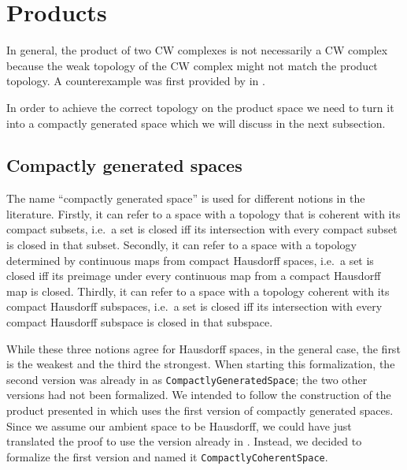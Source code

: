 \section{Products}\label{sec:products}

In general, the product of two CW complexes is not necessarily a CW complex because the weak topology of the CW complex might not match the product topology. 
A counterexample was first provided by \citeauthor{Dowker1952} in \cite{Dowker1952}.

In order to achieve the correct topology on the product space we need to turn it into a compactly generated space which we will discuss in the next subsection.

\subsection{Compactly generated spaces}

The name ``compactly generated space'' is used for different notions in the literature.
Firstly, it can refer to a space with a topology that is coherent with its compact subsets, i.e.\ a set is closed iff its intersection with every compact subset is closed in that subset. 
Secondly, it can refer to a space with a topology determined by continuous maps from compact Hausdorff spaces, i.e.\ a set is closed iff its preimage under every continuous map from a compact Hausdorff map is closed. 
Thirdly, it can refer to a space with a topology coherent with its compact Hausdorff subspaces, i.e.\ a set is closed iff its intersection with every compact Hausdorff subspace is closed in that subspace. 

While these three notions agree for Hausdorff spaces, in the general case, the first is the weakest and the third the strongest. 
When starting this formalization, the second version was already in \mathlib as \lstinline|CompactlyGeneratedSpace|; the two other versions had not been formalized. 
We intended to follow the construction of the product presented in \cite{Hatcher2002} which uses the first version of compactly generated spaces. 
Since we assume our ambient space to be Hausdorff, we could have just translated the proof to use the version already in \mathlib. 
Instead, we decided to formalize the first version and named it \lstinline|CompactlyCoherentSpace|.

